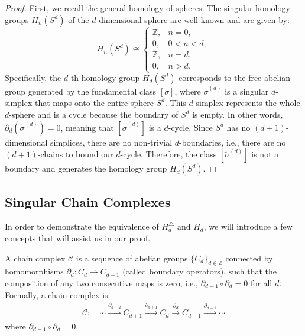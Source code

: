 \begin{proof}
	First, we recall the general homology of spheres. The singular homology groups $H_n(S^d)$ of the $d$-dimensional sphere are well-known and are given by:
    \[
    H_n(S^d) \cong 
    \begin{cases}
        \mathbb{Z}, & n = 0, \\
        0, & 0 < n < d, \\
        \mathbb{Z}, & n = d, \\
        0, & n > d.
    \end{cases}
    \]
    Specifically, the $d$-th homology group $H_d(S^d)$ corresponds to the free abelian group generated by the fundamental class $[\sigma]$, where $\tilde{\sigma}^{(d)}$ is a singular $d$-simplex that maps onto the entire sphere $S^d$. This $d$-simplex represents the whole $d$-sphere and is a cycle because the boundary of $S^d$ is empty. In other words, $\partial_d(\tilde{\sigma}^{(d)}) = 0$, meaning that $[\tilde{\sigma}^{(d)}]$ is a $d$-cycle. Since $S^d$ has no $(d+1)$-dimensional simplices, there are no non-trivial $d$-boundaries, i.e., there are no $(d+1)$-chains to bound our $d$-cycle. Therefore, the class $[\tilde{\sigma}^{(d)}]$ is not a boundary and generates the homology group $H_d(S^d)$.
\end{proof}

\subsection{Singular Chain Complexes}
\label{SingularChainComplexes}
In order to demonstrate the equivalence of \( H_{d}^{\triangle} \) and \( H_{d} \), we will introduce a few concepts that will assist us in our proof.

\begin{definition}
	\label{ChainComplex}
	A chain complex $\mathcal{C}$ is a sequence of abelian groups \(\{C_d\}_{d \in \mathbb{Z}}\) connected by homomorphisms \(\partial_d: C_d \to C_{d-1}\) (called boundary operators), such that the composition of any two consecutive maps is zero, i.e., \(\partial_{d-1} \circ \partial_d = 0\) for all \(d\). Formally, a chain complex is:
	\begin{align}
		\mathcal{C}: \quad\cdots \xrightarrow{\partial_{d+2}} C_{d+1} \xrightarrow{\partial_{d+1}} C_d \xrightarrow{\partial_d} C_{d-1} \xrightarrow{\partial_{d-1}} \cdots 
	\end{align}
	where \(\partial_{d-1} \circ \partial_d = 0\).
\end{definition}

